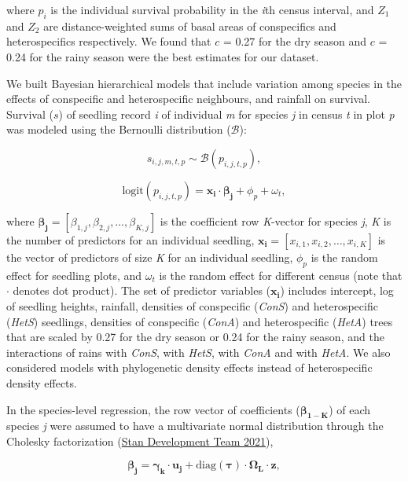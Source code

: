 \documentclass[
  12pt,
  letterpaper,
  DIV=11,
  numbers=noendperiod]{scrartcl}
\begin{document}
where \(p_i\) is the individual survival probability in the \emph{i}th
census interval, and \(Z_1\) and \(Z_2\) are distance-weighted sums of
basal areas of conspecifics and heterospecifics respectively. We found
that \(c\) = 0.27 for the dry season and \(c\) = 0.24 for the rainy
season were the best estimates for our dataset.

We built Bayesian hierarchical models that include variation among
species in the effects of conspecific and heterospecific neighbours, and
rainfall on survival. Survival (\(s\)) of seedling record \emph{i} of
individual \emph{m} for species \emph{j} in census \emph{t} in plot
\emph{p} was modeled using the Bernoulli distribution (\(\mathcal{B}\)):

\[
s_{i,j,m,t,p} \sim \mathcal{B}(p_{i, j, t, p}),
\]

\[
\mathrm{logit}(p_{i,j,t,p}) = \boldsymbol{x_{i}} \cdot \boldsymbol{\beta_{j}} + \phi_p + \omega_t,
\]

where
\(\boldsymbol{\beta_{j}} = \left[\beta_{1,j}, \beta_{2,j}, \ldots, \beta_{K,j} \right]\)
is the coefficient row \emph{K}-vector for species \emph{j}, \emph{K} is
the number of predictors for an individual seedling,
\(\boldsymbol{x_i} = \left[x_{i,1},x _{i,2}, \ldots,x_{i,K} \right]\) is
the vector of predictors of size \emph{K} for an individual seedling,
\(\phi_p\) is the random effect for seedling plots, and \(\omega_t\) is
the random effect for different census (note that \(\cdot\) denotes dot
product). The set of predictor variables (\(\boldsymbol{x_i}\)) includes
intercept, log of seedling heights, rainfall, densities of conspecific
(\emph{ConS}) and heterospecific (\emph{HetS}) seedlings, densities of
conspecific (\emph{ConA}) and heterospecific (\emph{HetA}) trees that
are scaled by 0.27 for the dry season or 0.24 for the rainy season, and
the interactions of rains with \emph{ConS}, with \emph{HetS}, with
\emph{ConA} and with \emph{HetA}. We also considered models with
phylogenetic density effects instead of heterospecific density effects.

In the species-level regression, the row vector of coefficients
(\(\boldsymbol{\beta_{1-K}}\)) of each species \emph{j} were assumed to
have a multivariate normal distribution through the Cholesky
factorization (\protect\hyperlink{ref-StanDevelopmentTeam2021}{Stan
Development Team 2021}),

\[
\boldsymbol{\beta_j} = \boldsymbol{\gamma_k} \cdot \boldsymbol{u_j} + \mathrm{diag}(\boldsymbol{\tau})\cdot \boldsymbol{\Omega_L} \cdot \boldsymbol{z},
\]
\end{document}
